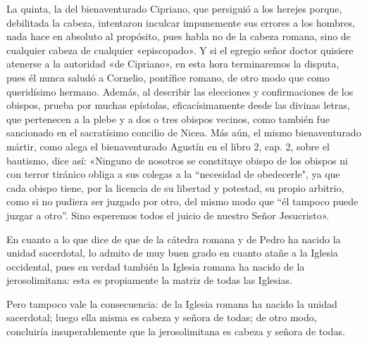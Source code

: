 La quinta, la del bienaventurado Cipriano, que persiguió a los herejes porque, debilitada la cabeza, intentaron inculcar impunemente sus errores a los hombres, nada hace en absoluto al propósito, pues habla no de la cabeza romana, sino de cualquier cabeza de cualquier «episcopado». Y si el egregio señor doctor quisiere atenerse a la autoridad «de Cipriano», en esta hora terminaremos la disputa, pues él nunca saludó a Cornelio, pontífice romano, de otro modo que como queridísimo hermano. Además, al describir las elecciones y confirmaciones de los obispos, prueba por muchas epístolas, eficacísimamente desde las divinas letras, que pertenecen a la plebe y a dos o tres obispos vecinos, como también fue sancionado en el sacratísimo concilio de Nicea. Más aún, el mismo bienaventurado mártir, como alega el bienaventurado Agustín en el libro 2, cap. 2, sobre el bautismo, dice así: «Ninguno de nosotros se constituye obispo de los obispos ni con terror tiránico obliga a sus colegas a la “necesidad de obedecerle", ya que cada obispo tiene, por la licencia de su libertad y potestad, su propio arbitrio, como si no pudiera ser juzgado por otro, del mismo modo que “él tampoco puede juzgar a otro”. Sino esperemos todos el juicio de nuestro Señor Jesucristo».

En cuanto a lo que dice de que de la cátedra romana y de Pedro ha nacido la unidad sacerdotal, lo admito de muy buen grado en cuanto atañe a la Iglesia occidental, pues en verdad también la Iglesia romana ha nacido de la jerosolimitana: esta es propiamente la matriz de todas las Iglesias.

Pero tampoco vale la consecuencia: de la Iglesia romana ha nacido la unidad sacerdotal; luego ella misma es cabeza y señora de todas; de otro modo, concluiría insuperablemente que la jerosolimitana es cabeza y señora de todas.

